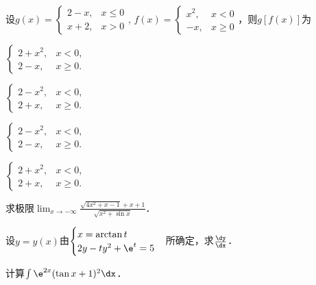 \documentclass[plain,noanswer,medmath]{../../template/jnuexam}
\begin{document}


\begin{problem}
设$g(x) = \begin{cases}
  2 - x, & x \le 0 \\
  x + 2, & x > 0
\end{cases}$, $f(x) = \begin{cases}
  x^2, & x < 0 \\
   -x, & x \ge 0
\end{cases}$，则$g[f(x)]$为\pickout{}
\begin{abcd}
\item $\begin{cases}
  2 + x^2, & x < 0, \\
    2 - x, & x \ge 0.
\end{cases}$
\item $\begin{cases}
  2 - x^2, & x < 0, \\
    2 + x, & x \ge 0.
\end{cases}$
\item $\begin{cases}
  2 - x^2, & x < 0, \\
    2 - x, & x \ge 0.
\end{cases}$
\item $\begin{cases}
  2 + x^2, & x < 0, \\
    2 + x, & x \ge 0.
\end{cases}$
\end{abcd}
\end{problem}




\begin{problem}
求极限$\lim_{x \to -\infty} \frac{\sqrt{4x^2 + x - 1} + x + 1}{\sqrt{x^2 + \sin x}}$．
\end{problem}


\begin{problem}
设$y = y(x)$由$\begin{cases}
  x = \arctan t \\
  2y - ty^2 + \e^t = 5
\end{cases}$所确定，求$\frac{\dy}{\dx}$．
\end{problem}


\begin{problem}
计算$\int \e^{2x} (\tan x + 1)^2 \dx$．
\end{problem}
\end{document}

